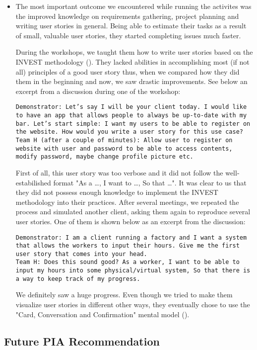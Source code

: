 \documentclass[11pt]{article}
\begin{document}
\begin{itemize}
\item The most important outcome we encountered while running the activites was the improved knowledge on requirements gathering, project planning and writing user stories in general. Being able to estimate their tasks as a result of small, valuable user stories, they started completing issues much faster. 

During the workshops, we taught them how to write user stories based on the INVEST methodology (\citet{invest}). They lacked abilities in accomplishing most (if not all) principles of a good user story thus, when we compared how they did them in the beginning and now, we saw drastic improvements. See below an excerpt from a discussion during one of the workshop:

\texttt{Demonstrator: Let's say I will be your client today. I would like to have an app that allows people to always be up-to-date with my bar. Let's start simple: I want my users to be able to register on the website. How would you write a user story for this use case?\\
Team H (after a couple of minutes): Allow user to register on website with user and password to be able to access contents, modify password, maybe change profile picture etc.}

First of all, this user story was too verbose and it did not follow the well-estabilished format "As a \dots, I want to \dots, So that \dots". It was clear to us that they did not possess enough knowledge to implement the INVEST methodology into their practices. After several meetings, we repeated the process and simulated another client, asking them again to reproduce several user stories. One of them is shown below as an excerpt from the discussion:

\texttt{Demonstrator: I am a client running a factory and I want a system that allows the workers to input their hours. Give me the first user story that comes into your head.
\\
Team H: Does this sound good? As a worker, I want to be able to input my hours into some physical/virtual system, So that there is a way to keep track of my progress.}

We definitely saw a huge progress. Even though we tried to make them visualize user stories in different other ways, they eventually chose to use the "Card, Conversation and Confirmation" mental model (\citet{primer}). 

\end{itemize}

\subsection*{Future PIA Recommendation}

\par







\end{document}

